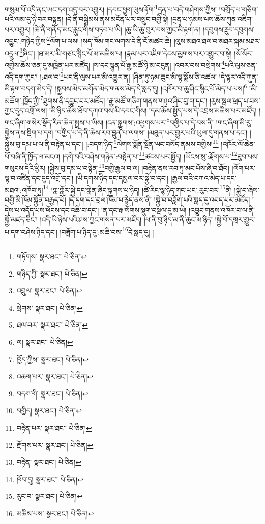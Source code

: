གསུམ་པོ་འདི་ནང་ཡང་དག་འདུ་བར་འགྱུར། །དབང་ཕྱུག་ལུས་རྟོག་\footnote{གཏོགས་  སྣར་ཐང་།  པེ་ཅིན། }དྲན་པ་བདེ་གཤེགས་ཀྱིས། །བགྲོད་པ་གཅིག་པའི་ལམ་དུ་ཉེ་བར་བསྟན། །དེ་ནི་བསྒྲིམས་ནས་མངོན་པར་བསྲུང་བགྱི་སྟེ། །དྲན་པ་ཉམས་པས་ཆོས་ཀུན་འཇིག་པར་འགྱུར། །ཚེ་ནི་གནོད་མང་རླུང་གིས་བཏབ་པ་ཡི། །ཆུ་ཡི་ཆུ་བུར་བས་ཀྱང་མི་རྟག་ན། །དབུགས་རྔུབ་དབུགས་འབྱུང་:གཉིད་ཀྱིས་\footnote{གཉིད་ཀྱི་  སྣར་ཐང་།  པེ་ཅིན། }ལོག་པ་ལས། །སད་ཁོམ་གང་ལགས་དེ་ནི་ངོ་མཚར་ཆེ། །ལུས་མཐའ་ཐལ་བ་མཐར་སྐམ་མཐར་འདྲུལ་\footnote{འབྲུལ་  སྣར་ཐང་།  པེ་ཅིན། }ཞིང་། །ཐ་མར་མི་གཙང་སྙིང་པོ་མ་མཆིས་པ། །རྣམ་པར་འཇིག་དེངས་མྱགས་པར་འགྱུར་བ་སྟེ། །སོ་སོར་འགྱེས་ཆོས་ཅན་དུ་མཁྱེན་པར་མཛོད། །ས་དང་ལྷུན་པོ་རྒྱ་མཚོ་ཉི་མ་བདུན། །འབར་བས་བསྲེགས་\footnote{སྲེགས་  སྣར་ཐང་།  པེ་ཅིན། }པའི་ལུས་ཅན་འདི་དག་ཀྱང་། །:ཐལ་བ་\footnote{ཐལ་བར་  སྣར་ཐང་།  པེ་ཅིན། }ཡང་ནི་ལུས་པར་མི་འགྱུར་ན། །ཤིན་ཏུ་ཉམ་ཆུང་མི་ལྟ་སྨོས་ཅི་འཚལ། །དེ་ལྟར་འདི་ཀུན་མི་རྟག་བདག་མེད་དེ། །སྐྱབས་མེད་མགོན་མེད་གནས་མེད་དེ་སླད་དུ། །འཁོར་བ་ཆུ་ཤིང་སྙིང་པོ་མེད་པ་ལས།\footnote{ལ།  སྣར་ཐང་།  པེ་ཅིན། } །མི་མཆོག་:ཁྱོད་ཀྱི་\footnote{ཁྱོད་ཀྱིས་  སྣར་ཐང་།  པེ་ཅིན། }ཐུགས་ནི་དབྱུང་བར་མཛོད། །རྒྱ་མཚོ་གཅིག་གནས་གཉའ་ཤིང་བུ་ག་དང་། །རུས་སྦལ་ཕྲད་པ་བས་ཀྱང་དུད་འགྲོ་ལས། །མི་ཉིད་ཆེས་ཐོབ་དཀའ་བས་མི་དབང་གིས། །དམ་ཆོས་སྤྱོད་པས་དེ་འབྲས་མཆིས་པར་མཛོད། །གང་ཞིག་གསེར་སྣོད་རིན་ཆེན་སྤྲས་པ་ཡིས། །ངན་སྐྱུགས་:འཕྱགས་པར་\footnote{འཆག་པར་  སྣར་ཐང་།  པེ་ཅིན། }བགྱིད་པ་དེ་བས་ནི། །གང་ཞིག་མི་རུ་སྐྱེས་ནས་སྡིག་པ་དག །བགྱིད་པ་དེ་ནི་ཆེས་རབ་བླུན་པ་ལགས། །མཐུན་པར་གྱུར་པའི་ཡུལ་དུ་གནས་པ་དང་། །སྐྱེས་བུ་དམ་པ་ལ་ནི་བརྟེན་པ་དང་། །:བདག་ཉིད་\footnote{བདག་གི་  སྣར་ཐང་།  པེ་ཅིན། }ལེགས་སྨོན་སྔོན་ཡང་བསོད་ནམས་བགྱིས།\footnote{བགྱིད།  སྣར་ཐང་།  པེ་ཅིན། } །འཁོར་ལོ་ཆེན་པོ་བཞི་ནི་ཁྱོད་ལ་མངའ། །དགེ་བའི་བཤེས་གཉེན་:བསྟེན་པ་\footnote{བརྟེན་པར་  སྣར་ཐང་།  པེ་ཅིན། }ཚངས་པར་སྤྱོད། །ཡོངས་སུ་:རྫོགས་པ་\footnote{རྫོགས་པར་  སྣར་ཐང་།  པེ་ཅིན། }ཐུབ་པས་གསུངས་དེའི་ཕྱིར། །སྐྱེས་བུ་དམ་པ་བསྟེན་\footnote{བརྟེན་  སྣར་ཐང་།  པེ་ཅིན། }བགྱི་རྒྱལ་བ་ལ། །བརྟེན་ནས་རབ་ཏུ་མང་པོས་ཞི་བ་ཐོབ། །ལོག་པར་ལྟ་བ་འཛིན་དང་དུད་འགྲོ་དང་། །ཡི་དགས་ཉིད་དང་དམྱལ་བར་སྐྱེ་བ་དང་། །རྒྱལ་བའི་བཀའ་མེད་པ་དང་མཐའ་:འཁོབ་ཏུ།\footnote{ཁོབ་དུ།  སྣར་ཐང་།  པེ་ཅིན། } །ཀླ་ཀློར་སྐྱེ་དང་གླེན་ཞིང་ལྐུགས་པ་ཉིད། །ཚེ་རིང་ལྷ་ཉིད་གང་ཡང་:རུང་བར་\footnote{རུང་བ་  སྣར་ཐང་།  པེ་ཅིན། }ནི། །སྐྱེ་བ་ཞེས་བགྱི་མི་ཁོམ་སྐྱོན་བརྒྱད་པོ། །དེ་དག་དང་བྲལ་ཁོམ་པ་རྙེད་ནས་ནི། །སྐྱེ་བ་བཟློག་པའི་སླད་དུ་འབད་པར་མཛོད། །དེས་པ་འདོད་པས་ཕོངས་དང་འཆི་བ་དང་། །ན་དང་རྒ་སོགས་སྡུག་བསྔལ་དུ་མ་ཡི། །འབྱུང་གནས་འཁོར་བ་ལ་ནི་སྐྱོ་མཛད་ཅིང་། །འདི་ཡི་ཉེས་པའི་ཤས་ཀྱང་གསན་པར་མཛོད། །ཕ་ནི་བུ་ཉིད་མ་ནི་ཆུང་མ་ཉིད། །སྐྱེ་བོ་དགྲར་གྱུར་པ་དག་བཤེས་ཉིད་དང་། །བཟློག་པ་ཉིད་དུ་:མཆི་བས་\footnote{མཆིས་པས་  སྣར་ཐང་།  པེ་ཅིན། }དེ་སླད་དུ། །
